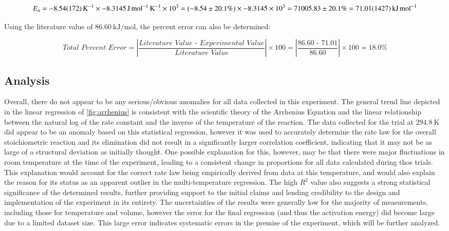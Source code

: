 \[E_a = \SI{-8.54\pm1.72}{\per\kelvin} \times -\SI{8.3145}{\joule\per\mole\per\kelvin} \times 10^3 = (-8.54 \pm 20.1\%) \times -8.3145 \times 10^3 = 71005.83 \pm 20.1\% = \SI{71.01\pm14.27}{\kilo\joule\per\mole}\]

 Using the literature value of $\SI{86.60}{\kilo\joule\per\mole}$, the percent error can also be determined:

 \[\textit{Total Percent Error} = \left|\frac{\textit{Literature Value - Experimental Value}}{\textit{Literature Value}}\right| \times 100 = \left|\frac{\textit{86.60 - 71.01}}{\textit{86.60}}\right| \times 100 = 18.0\%\]





\subsection{Analysis}
Overall, there do not appear to be any serious/obvious anomalies for all data collected in this experiment. The general trend line depicted in the linear regression of \cref{fig:arrhenius} is consistent with the scientific theory of the Arrhenius Equation and the linear relationship between the natural log of the rate constant and the inverse of the temperature of the reaction. The data collected for the trial at $\SI{294.8}{\kelvin}$ did appear to be an anomaly based on this statistical regression, however it was used to accurately determine the rate law for the overall stoichiometric reaction and its elimination did not result in a significantly larger correlation coefficient, indicating that it may not be as large of a structural deviation as initially thought. One possible explanation for this, however, may be that there were major fluctuations in room temperature at the time of the experiment, leading to a consistent change in proportions for all data calculated during thos trials. This explanation would account for the correct rate law being empirically derived from data at this temperature, and would also explain the reason for its status as an apparent outlier in the multi-temperature regression. The high $R^2$ value also suggests a strong statistical significance of the determined results, further providing support to the initial claims and lending credibility to the design and implementation of the experiment in its entirety. The uncertainties of the results were generally low for the majority of measurements, including those for temperature and volume, however the error for the final regression (and thus the activation energy) did become large due to a limited dataset size. This large error indicates systematic errors in the premise of the experiment, which will be further analyzed. 


\newpage